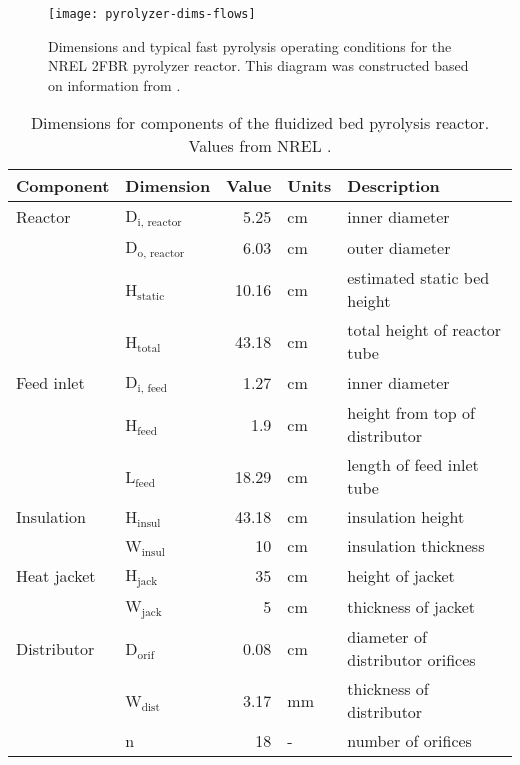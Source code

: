 \begin{figure}[H]
    \centering
    \texttt{[image: pyrolyzer-dims-flows]}
    \caption{Dimensions and typical fast pyrolysis operating conditions for the NREL 2FBR pyrolyzer reactor. This diagram was constructed based on information from \cite{French-2019}.}
    \label{fig:pyrolyzer-dims-flows}
\end{figure}

\begin{table}[H]
    \centering
    \caption{Dimensions for components of the fluidized bed pyrolysis reactor. Values from NREL \cite{French-2019}.}
    \label{tab:dimensions}
    \begin{tabular}{llrll}
        \toprule
        Component & Dimension & Value & Units & Description \\
        \midrule
        Reactor
            & D$_\mathrm{i,\,reactor}$ & 5.25 & cm & inner diameter \\
            & D$_\mathrm{o,\,reactor}$ & 6.03 & cm & outer diameter \\
            & H$_\mathrm{static}$ & 10.16 & cm & estimated static bed height \\
            & H$_\mathrm{total}$ & 43.18 & cm & total height of reactor tube \\
        Feed inlet
            & D$_\mathrm{i,\,feed}$ & 1.27 & cm & inner diameter \\
            & H$_\mathrm{feed}$ & 1.9 & cm & height from top of distributor \\
            & L$_\mathrm{feed}$ & 18.29 & cm & length of feed inlet tube \\
        Insulation
            & H$_\textrm{insul}$ & 43.18 & cm & insulation height \\
            & W$_\textrm{insul}$ & 10 & cm & insulation thickness \\
        Heat jacket
            & H$_\textrm{jack}$ & 35 & cm & height of jacket \\
            & W$_\textrm{jack}$ & 5 & cm & thickness of jacket \\
        Distributor
            & D$_\mathrm{orif}$ & 0.08 & cm & diameter of distributor orifices \\
            & W$_\textrm{dist}$ & 3.17 & mm & thickness of distributor \\
            & n & 18 & - & number of orifices \\
        \bottomrule
    \end{tabular}
\end{table}

